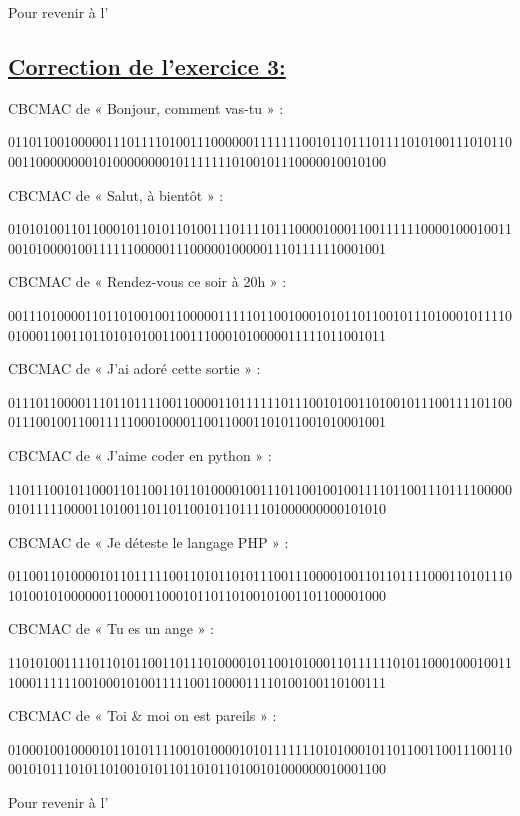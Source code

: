 \par Pour revenir à l'

\subsection{\textbf{\underline{Correction de l'exercice 3:}}}\label{C_Exo 3}

CBCMAC de « Bonjour, comment vas-tu » :

011011001000001110111101001110000001111111001011011101111010100111010110001100000000101000000001011111110100101110000010010100

CBCMAC de « Salut, à bientôt » : 

010101001101100010110101101001110111101110000100011001111110000100010011001010000100111111000001110000010000011101111110001001

CBCMAC de « Rendez-vous ce soir à 20h » :

001110100001101101001001100000111110110010001010110110010111010001011110010001100110110101010011001110001010000011111011001011

CBCMAC de « J’ai adoré cette sortie » :

011101100001110110111100110000110111111011100101001101001011100111101100011100100110011111000100001100110001101011001010001001

CBCMAC de « J’aime coder en python » :

110111001011000110110011011010000100111011001001001111011001110111100000010111110000110100110110110010110111101000000000101010

CBCMAC de « Je déteste le langage PHP » :

011001101000010110111110011010110101110011100001001101101111000110101110101001010000001100001100010110110100101001101100001000

CBCMAC de « Tu es un ange » :

110101001111011010110011011101000010110010100011011111101011000100010011100011111100100010100111110011000011110100100110100111

CBCMAC de « Toi \& moi on est pareils » :

010001001000010110101111001010000101011111110101000101101100110011100110001010111010110100101011011010110100101000000010001100\\

\par Pour revenir à l'

